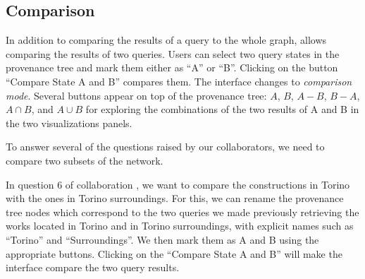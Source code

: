 \subsection{Comparison}

In addition to comparing the results of a query to the whole graph, \name allows comparing the results of two queries.
Users can select two query states in the provenance tree and mark them either as ``A'' or ``B''.
Clicking on the button ``Compare State A and B'' compares them.
The interface changes to \emph{comparison mode}.
Several buttons appear on top of the provenance tree: $A$, $B$, $A-B$, $B-A$, $A \cap B$, and $A \cup B$ for exploring the combinations of the two results of A and B in the two visualizations panels.

To answer several of the questions raised by our collaborators, we need to compare two subsets of the network.

In question 6 of collaboration \pascal, we want to compare the constructions in Torino with the ones in Torino surroundings.
For this, we can rename the provenance tree nodes which correspond to the two queries we made previously retrieving the works located in Torino and in Torino surroundings,
with explicit names such as ``Torino'' and ``Surroundings''. We then mark them as A and B using the appropriate buttons.
Clicking on the ``Compare State A and B'' will make the interface compare the two query results.



